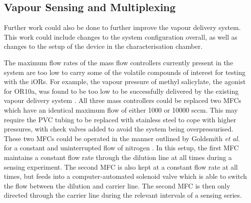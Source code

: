 \documentclass[
  a4paper,
]{scrbook}
\begin{document}
\hypertarget{sec-future-work-vapour}{%
\subsection{Vapour Sensing and
Multiplexing}\label{sec-future-work-vapour}}

Further work could also be done to further improve the vapour delivery
system. This work could include changes to the system configuration
overall, as well as changes to the setup of the device in the
characterisation chamber.

The maximum flow rates of the mass flow controllers currently present in
the system are too low to carry some of the volatile compounds of
interest for testing with the iORs. For example, the vapour pressure of
methyl salicylate, the agonist for OR10a, was found to be too low to be
successfully delivered by the existing vapour delivery system
\autocite{MeSal}. All three mass controllers could be replaced two MFCs
which have an identical maximum flow of either 1000 or 10000 sccm. This
may require the PVC tubing to be replaced with stainless steel to cope
with higher pressures, with check valves added to avoid the system being
overpressurised. These two MFCs could be operated in the manner outlined
by Goldsmith \emph{et al.} for a constant and uninterrupted flow of
nitrogen \autocite{Goldsmith2011}. In this setup, the first MFC
maintains a constant flow rate through the dilution line at all times
during a sensing experiment. The second MFC is also kept at a constant
flow rate at all times, but feeds into a computer-automated solenoid
valve which is able to switch the flow between the dilution and carrier
line. The second MFC is then only directed through the carrier line
during the relevant intervals of a sensing series.
\end{document}
